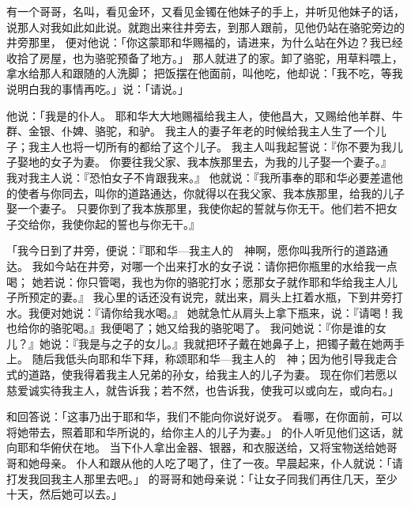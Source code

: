 {有一个哥哥，名叫{}，看见金环，又看见金镯在他妹子的手上，并听见他妹子{}的话，说那人对我如此如此说。{}就跑出来往井旁去，到那人跟前，见他仍站在骆驼旁边的井旁那里，
便对他说：「你这蒙耶和华赐福的，请进来，为什么站在外边？我已经收拾了房屋，也为骆驼预备了地方。」
那人就进了{}的家。{}卸了骆驼，用草料喂上，拿水给那人和跟随的人洗脚；
把饭摆在他面前，叫他吃，他却说：「我不吃，等我说明白我的事情再吃。」{}说：「请说。」
\par }{\PP {}他说：「我是{}的仆人。
耶和华大大地赐福给我主人，使他昌大，又赐给他羊群、牛群、金银、仆婢、骆驼，和驴。
我主人的妻子{}年老的时候给我主人生了一个儿子；我主人也将一切所有的都给了这个儿子。
我主人叫我起誓说：『你不要为我儿子娶{}地的女子为妻。
你要往我父家、我本族那里去，为我的儿子娶一个妻子。』
我对我主人说：『恐怕女子不肯跟我来。』
他就说：『我所事奉的耶和华必要差遣他的使者与你同去，叫你的道路通达，你就得以在我父家、我本族那里，给我的儿子娶一个妻子。
只要你到了我本族那里，我使你起的誓就与你无干。他们若不把女子交给你，我使你起的誓也与你无干。』
\par }{\PP {}「我今日到了井旁，便说：『耶和华—我主人{}的　神啊，愿你叫我所行的道路通达。
我如今站在井旁，对哪一个出来打水的女子说：请你把你瓶里的水给我一点喝；
她若说：你只管喝，我也为你的骆驼打水；愿那女子就作耶和华给我主人儿子所预定的妻。』
我心里的话还没有说完，{}就出来，肩头上扛着水瓶，下到井旁打水。我便对她说：『请你给我水喝。』
她就急忙从肩头上拿下瓶来，说：『请喝！我也给你的骆驼喝。』我便喝了；她又给我的骆驼喝了。
我问她说：『你是谁的女儿？』她说：『我是{}与{}之子{}的女儿。』我就把环子戴在她鼻子上，把镯子戴在她两手上。
随后我低头向耶和华下拜，称颂耶和华—我主人{}的　神；因为他引导我走合式的道路，使我得着我主人兄弟的孙女，给我主人的儿子为妻。
现在你们若愿以慈爱诚实待我主人，就告诉我；若不然，也告诉我，使我可以或向左，或向右。」
\par }{\PP {}和{}回答说：「这事乃出于耶和华，我们不能向你说好说歹。
看哪，{}在你面前，可以将她带去，照着耶和华所说的，给你主人的儿子为妻。」
的仆人听见他们这话，就向耶和华俯伏在地。
当下仆人拿出金器、银器，和衣服送给{}，又将宝物送给她哥哥和她母亲。
仆人和跟从他的人吃了喝了，住了一夜。早晨起来，仆人就说：「请打发我回我主人那里去吧。」
的哥哥和她母亲说：「让女子同我们再住几天，至少十天，然后她可以去。」
}
